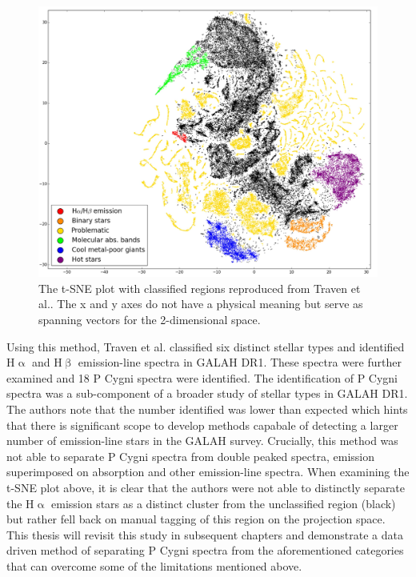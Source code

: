 \begin{figure}[!htb]
\centering
\includegraphics[scale=0.40]{figures/tsne traven.png}
\caption{The t-SNE plot with classified regions reproduced from Traven et al.\cite{traven2017galah}. The x and y axes do not have a physical meaning but serve as spanning vectors for the 2-dimensional space.}
\end{figure}

Using this method, Traven et al. classified six distinct stellar types and identified H$\upalpha$ and H$\upbeta$ emission-line spectra in GALAH DR1. These spectra were further examined and 18 P Cygni spectra were identified. The identification of P Cygni spectra was a sub-component of a broader study of stellar types in GALAH DR1. The authors note that the number identified was lower than expected which hints that there is significant scope to develop methods capabale of detecting a larger number of emission-line stars in the GALAH survey. Crucially, this method was not able to separate P Cygni spectra from double peaked spectra, emission superimposed on absorption and other emission-line spectra. When examining the t-SNE plot above, it is clear that the authors were not able to distinctly separate the H$\upalpha$ emission stars as a distinct cluster from the unclassified region (black) but rather fell back on manual tagging of this region on the projection space. This thesis will revisit this study in subsequent chapters and demonstrate a data driven method of separating P Cygni spectra from the aforementioned categories that can overcome some of the limitations mentioned above.

